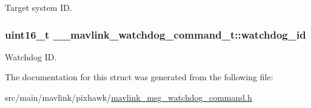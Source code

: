 Target system I\+D. 

\hypertarget{struct____mavlink__watchdog__command__t_adeccc76ded28d25b7702181985dfc0c0}{
\subsubsection[{watchdog\+\_\+id}]{\setlength{\rightskip}{0pt plus 5cm}uint16\+\_\+t \+\_\+\+\_\+mavlink\+\_\+watchdog\+\_\+command\+\_\+t\+::watchdog\+\_\+id}}\label{struct____mavlink__watchdog__command__t_adeccc76ded28d25b7702181985dfc0c0}


Watchdog I\+D. 



The documentation for this struct was generated from the following file\+:\begin{DoxyCompactItemize}
\item 
src/main/mavlink/pixhawk/\hyperlink{mavlink__msg__watchdog__command_8h}{mavlink\+\_\+msg\+\_\+watchdog\+\_\+command.\+h}\end{DoxyCompactItemize}

